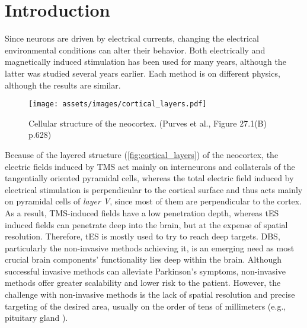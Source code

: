 \pagebreak
{}
\chapter{Introduction}
Since neurons are driven by electrical currents, changing the electrical environmental conditions can alter their behavior. Both electrically and magnetically induced stimulation has been used for many years, although the latter was studied several years earlier. Each method is on different physics, although the results are similar.

\begin{wrapfigure}{l}{0.40\textwidth}
    \centering
    \texttt{[image: assets/images/cortical\_layers.pdf]}
    \caption{Cellular structure of the neocortex. (Purves et al.\cite{Purves2012}, Figure 27.1(B) p.628)}
    \label{fig:cortical_layers}
\end{wrapfigure}

Because of the layered structure (\autoref{fig:cortical_layers}) of the neocortex, the electric fields induced by \gls{TMS} act mainly on interneurons and collaterals of the tangentially oriented pyramidal cells, whereas the total electric field induced by electrical stimulation is perpendicular to the cortical surface and thus acts mainly on pyramidal cells of \textit{layer V}, since most of them are perpendicular to the cortex. As a result, \gls{TMS}-induced fields have a low penetration depth, whereas \gls{tES} induced fields can penetrate deep into the brain, but at the expense of spatial resolution. Therefore, \gls{tES} is mostly used to try to reach deep targets.
\gls{DBS}, particularly the non-invasive methods achieving it, is an emerging need as most crucial brain components' functionality lies deep within the brain. Although successful invasive methods can alleviate Parkinson's symptoms, non-invasive methods offer greater scalability and lower risk to the patient. However, the challenge with non-invasive methods is the lack of spatial resolution and precise targeting of the desired area, usually on the order of tens of millimeters (e.g., pituitary gland \cite{Yadav2017_pituitary}).

